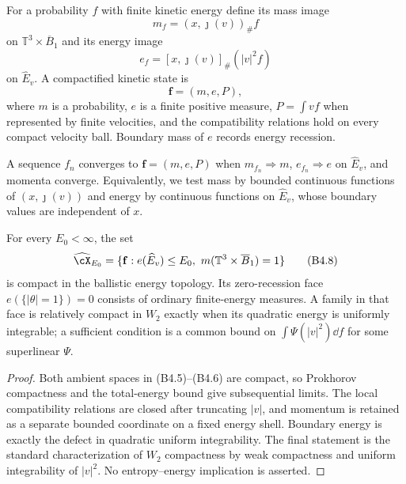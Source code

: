 For a probability $f$ with finite kinetic energy define its mass image
\[
 m_f=(x,\jmath(v))_\#f                                   \tag{B4.5}
\]
on $\mathbb T^3\times\overline B_1$ and its energy image
\[
 e_f=[x,\jmath(v)]_\#(|v|^2f)                             \tag{B4.6}
\]
on $\widehat E_v$.  A compactified kinetic state is
\[
 \mathbf f=(m,e,P),                                       \tag{B4.7}
\]
where $m$ is a probability, $e$ is a finite positive measure,
$P=\int v f$ when represented by finite velocities, and the compatibility
relations hold on every compact velocity ball.  Boundary mass of $e$ records
energy recession.

\begin{definition}
\label{def:r31-b4-topology}
A sequence $f_n$ converges to $\mathbf f=(m,e,P)$ when $m_{f_n}\Rightarrow m$,
$e_{f_n}\Rightarrow e$ on $\widehat E_v$, and momenta converge.  Equivalently,
we test mass by bounded continuous functions of $(x,\jmath(v))$ and energy by
continuous functions on $\widehat E_v$, whose boundary values are independent
of $x$.
\end{definition}

\begin{proposition}
\label{prop:r31-b4-compact-shell}
For every $E_0<\infty$, the set
\[
 \widehat\cX_{E_0}=\{\mathbf f:e(\widehat E_v)\le E_0,
                      \ m(\mathbb T^3\times\overline B_1)=1\}            \tag{B4.8}
\]
is compact in the ballistic energy topology.  Its zero-recession face
$e(\{|\theta|=1\})=0$ consists of ordinary finite-energy measures.  A family
in that face is relatively compact in $W_2$ exactly when its quadratic energy
is uniformly integrable; a sufficient condition is a common bound on
$\int\Psi(|v|^2)\dd f$ for some superlinear $\Psi$.
\end{proposition}

\begin{proof}
Both ambient spaces in (B4.5)--(B4.6) are compact, so Prokhorov compactness and
the total-energy bound give subsequential limits.  The local compatibility
relations are closed after truncating $|v|$, and momentum is retained as a
separate bounded coordinate on a fixed energy shell.  Boundary energy is
exactly the defect in quadratic uniform integrability.  The final statement
is the standard characterization of $W_2$ compactness by weak compactness and
uniform integrability of $|v|^2$.  No entropy--energy implication is asserted.
\end{proof}

